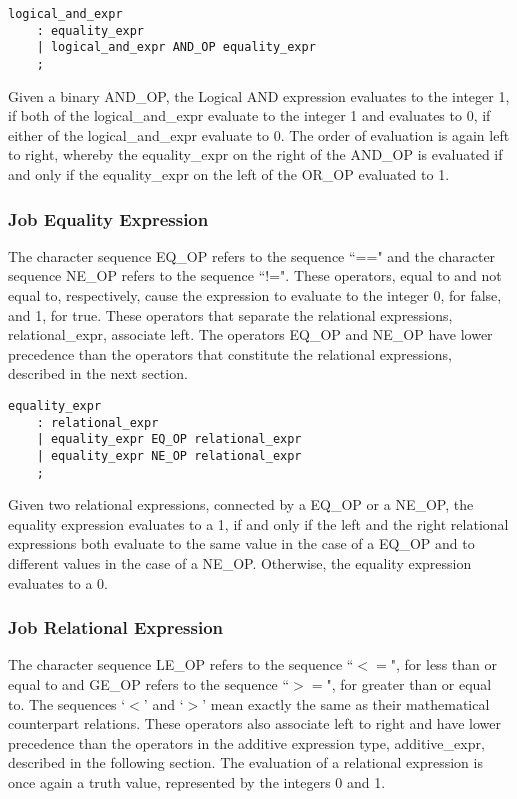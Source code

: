\documentclass[prodmode,acmtecs]{acmsmall}
\begin{document}
\begin{lstlisting}
logical_and_expr
	: equality_expr
	| logical_and_expr AND_OP equality_expr
	;
\end{lstlisting}

Given a binary AND\_OP, the Logical AND expression evaluates to the 
integer 1, if both of the logical\_and\_expr evaluate to the integer 1 
and evaluates to 0, if either of the logical\_and\_expr evaluate to 0. 
The order of evaluation is again left to right, whereby the 
equality\_expr on the right of the AND\_OP is evaluated if and only 
if the equality\_expr on the left of the OR\_OP evaluated to 1.

\subsubsection{Job Equality Expression}

The character sequence EQ\_OP refers to the sequence ``==" and the 
character sequence NE\_OP refers to the sequence ``!=". These operators, 
equal to and not equal to, respectively, cause the expression to 
evaluate to the integer 0, for false, and 1, for true.  These operators 
that separate the relational expressions, relational\_expr, associate 
left. The operators EQ\_OP and NE\_OP have lower precedence than the 
operators that constitute the relational expressions, described in the 
next section. 

\begin{lstlisting}
equality_expr
	: relational_expr
	| equality_expr EQ_OP relational_expr
	| equality_expr NE_OP relational_expr
	;
\end{lstlisting}

Given two relational expressions, connected by a EQ\_OP or a NE\_OP, 
the equality expression evaluates to a 1, if and only if the left and 
the right relational expressions both evaluate to the same value in the 
case of a EQ\_OP and to different values in the case of a NE\_OP. 
Otherwise, the equality expression evaluates to a 0.

\subsubsection{Job Relational Expression}

The character sequence LE\_OP refers to the sequence ``$<=$", for less 
than or equal to and GE\_OP refers to the sequence ``$>=$", for greater 
than or equal to. The sequences `$<$' and `$>$' mean exactly the same as 
their mathematical counterpart relations. These operators also associate 
left to right and have lower precedence than the operators in the additive 
expression type, additive\_expr, described in the following section. The 
evaluation of a relational expression is once again a truth value, 
represented by the integers 0 and 1. 
\end{document}
